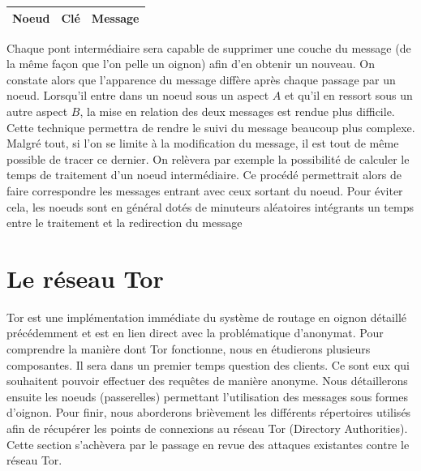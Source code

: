 \documentclass[letterpaper]{article}
\begin{document}
\begin{table}[!htbp]
\centering
\begin{tabular}{|l|l|l|}
\hline
Noeud & Clé & Message \\ \hline
\end{tabular}
\end{table}


\noindent Chaque pont intermédiaire sera capable de supprimer une couche du message (de la même façon que l'on pelle un oignon) afin d'en obtenir un nouveau. On constate alors que l'apparence du message diffère après chaque passage par un noeud. Lorsqu'il entre dans un noeud sous un aspect $A$ et qu'il en ressort sous un autre aspect $B$, la mise en relation des deux messages est rendue plus difficile. Cette technique permettra de rendre le suivi du message beaucoup plus complexe. Malgré tout, si l'on se limite à la modification du message, il est tout de même possible de tracer ce dernier. On relèvera par exemple la possibilité de calculer le temps de traitement d'un noeud intermédiaire. Ce procédé permettrait alors de faire correspondre les messages entrant avec ceux sortant du noeud. Pour éviter cela, les noeuds sont en général dotés de minuteurs aléatoires intégrants un temps entre le traitement et la redirection du message

\section{Le réseau Tor}
Tor est une implémentation immédiate du système de routage en oignon détaillé précédemment et est en lien direct avec la problématique d'anonymat. Pour comprendre la manière dont Tor fonctionne, nous en étudierons plusieurs composantes. Il sera dans un premier temps question des clients. Ce sont eux qui souhaitent pouvoir effectuer des requêtes de manière anonyme. Nous détaillerons ensuite les noeuds (passerelles) permettant l'utilisation des messages sous formes d'oignon. Pour finir, nous aborderons brièvement les différents répertoires utilisés afin de récupérer les points de connexions au réseau Tor (Directory Authorities). Cette section s'achèvera par le passage en revue des attaques existantes contre le réseau Tor.
\end{document}
